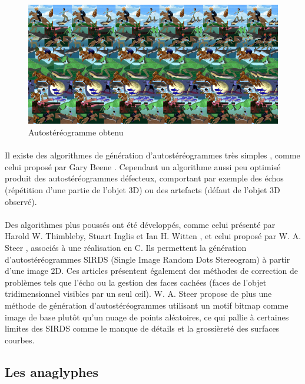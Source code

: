 \begin{figure}[h]
		\centering
		\includegraphics[scale=0.5]{autostereog.png}
		\caption{\label{fig:autostereogramme} Autostéréogramme obtenu \protect \footnotemark }
\end{figure}

\paragraph{}
Il existe des algorithmes de génération d’autostéréogrammes très simples , comme celui proposé par Gary Beene \cite{garybeene}. Cependant un algorithme aussi peu optimisé produit des autostéréogrammes défecteux, comportant par exemple des échos (répétition d'une partie de l'objet 3D) ou des artefacts (défaut de l'objet 3D observé).

\paragraph{}
Des algorithmes plus poussés ont été développés, comme celui présenté par Harold W. Thimbleby, Stuart Inglis et Ian H. Witten \cite{stereogram}, et celui proposé par W. A. Steer \cite{wasteer}, associés à une réalisation en C. Ils permettent la génération d’autostéréogrammes SIRDS (Single Image Random Dots Stereogram) à partir d’une image 2D. Ces articles présentent également des méthodes de correction de problèmes tels que l'écho ou la gestion des faces cachées (faces de l'objet tridimensionnel visibles par un seul œil). W. A. Steer propose de plus une méthode de génération d'autostéréogrammes utilisant un motif bitmap comme image de base plutôt qu'un nuage de points aléatoires, ce qui pallie à certaines limites des SIRDS comme le manque de détails et la grossièreté des surfaces courbes.


\subsection{Les anaglyphes}

